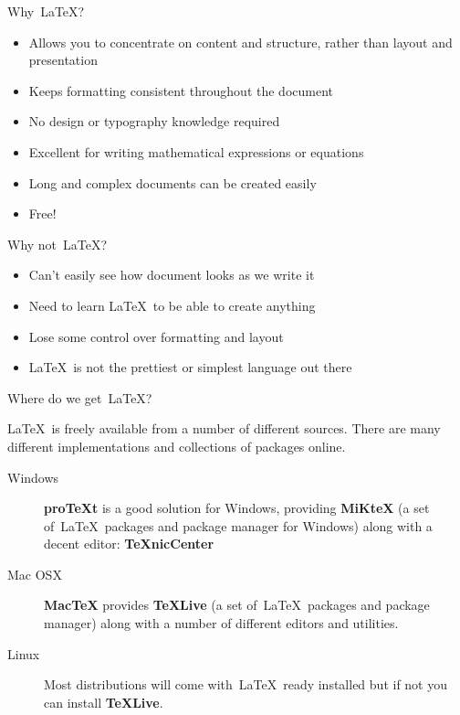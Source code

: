 \documentclass[mathserif]{beamer}
\begin{document}
\begin{frame}{Why~\LaTeX?}

\begin{itemize}
	\item Allows you to concentrate on content and structure, rather than layout and presentation
	\item Keeps formatting consistent throughout the document
	\item No design or typography knowledge required
	\item Excellent for writing mathematical expressions or equations
	\item Long and complex documents can be created easily
	\item Free!
\end{itemize}

\end{frame}


\begin{frame}{Why not~\LaTeX?}

\begin{itemize}
	\item Can't easily see how document looks as we write it
	\item Need to learn \LaTeX\ to be able to create anything
	\item Lose some control over formatting and layout
	\item \LaTeX\ is not the prettiest or simplest language out there
\end{itemize}

\end{frame}


\begin{frame}{Where do we get~\LaTeX?}

\LaTeX\ is freely available from a number of different sources. There are many different implementations and collections of packages online.
\vfill
\begin{description}
	\item[Windows] \textbf{proTeXt} is a good solution for Windows, providing \textbf{MiKteX} (a set of~\LaTeX\ packages and package manager for Windows) along with a decent editor: \textbf{TeXnicCenter}
	\item[Mac OSX] \textbf{MacTeX} provides \textbf{TeXLive} (a set of~\LaTeX\ packages and package manager) along with a number of different editors and utilities.
	\item[Linux] Most distributions will come with~\LaTeX\ ready installed but if not you can install \textbf{TeXLive}.
\end{description}

\end{frame}
\end{document}
